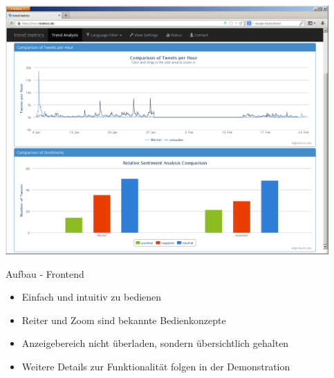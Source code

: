 \begin{frame}
    \includegraphics[width=0.926\textwidth]{../img/shots/07.png}
\end{frame}

\begin{frame}{Aufbau - Frontend}
    \begin{itemize}
        \item Einfach und intuitiv zu bedienen
        \item Reiter und Zoom sind bekannte Bedienkonzepte
        \item Anzeigebereich nicht überladen, sondern übersichtlich gehalten
        \item Weitere Details zur Funktionalität folgen in der Demonstration
    \end{itemize}
\end{frame}

